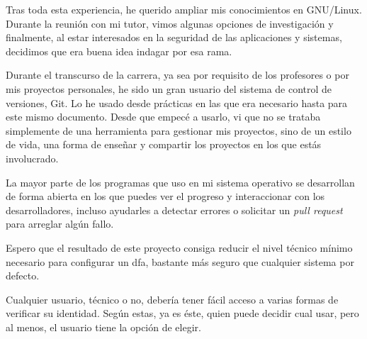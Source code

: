 \documentclass[titlepage, 12pt, a4paper]{article}
\begin{document}
Tras toda esta experiencia, he querido ampliar mis conocimientos en \gls{GNU/Linux}. Durante la reunión con mi tutor, vimos algunas opciones de investigación y finalmente, al estar interesados en la seguridad de las aplicaciones y sistemas, decidimos que era buena idea indagar por esa rama.\par
Durante el transcurso de la carrera, ya sea por requisito de los profesores o por mis proyectos personales, he sido un gran usuario del sistema de control de versiones, \gls{Git}. Lo he usado desde prácticas en las que era necesario hasta para este mismo documento. Desde que empecé a usarlo, vi que no se trataba simplemente de una herramienta para gestionar mis proyectos, sino de un estilo de vida, una forma de enseñar y compartir los proyectos en los que estás involucrado.\par
La mayor parte de los programas que uso en mi sistema operativo se desarrollan de forma abierta en los que puedes ver el progreso y interaccionar con los desarrolladores, incluso ayudarles a detectar errores o solicitar un \textit{pull request} para arreglar algún fallo.\par
Espero que el resultado de este proyecto consiga reducir el nivel técnico mínimo necesario para configurar un \gls{dfa}, bastante más seguro que cualquier sistema por defecto.\par
Cualquier usuario, técnico o no, debería tener fácil acceso a varias formas de verificar su identidad. Según estas, ya es éste, quien puede decidir cual usar, pero al menos, el usuario tiene la opción de elegir.
\end{document}
